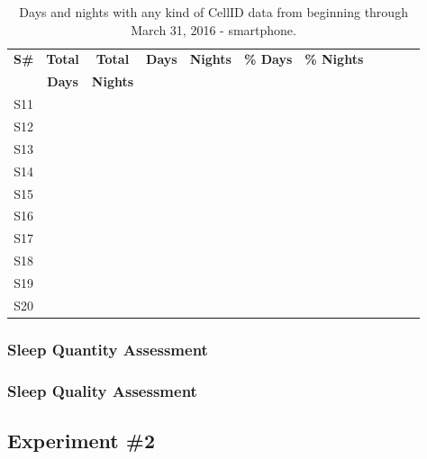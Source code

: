 \documentclass[12pt]{article} %
\begin{document}
\begin{table}[H]
\center
\begin{footnotesize}
	\begin{tabular}{| c | c | c || c | c | c | c | c | c | c | c |}
	\hline
	\textbf{S\#} & \textbf{Total} & \textbf{Total} & \textbf{Days} & \textbf{Nights} & \textbf{\% Days} & \textbf{\% Nights}\\
	& \textbf{Days} & \textbf{Nights} & & & &\\
	\hline
	S11 & & & & & &\\
	S12 & & & & & & \\
	S13 & & & & & & \\
	S14 & & & & & & \\
	S15 & & & & & & \\
	S16 & & & & & & \\
	S17 & & & & & & \\
	S18 & & & & & & \\
	S19 & & & & & & \\
	S20 & & & & & & \\
	\hline
	\end{tabular}
	\caption{Days and nights with any kind of CellID data from beginning through March 31, 2016 - smartphone.}
	\label{tab:daysNightsExp1Phone}
\end{footnotesize}
\end{table}


\subsubsection{Sleep Quantity Assessment}






\subsubsection{Sleep Quality Assessment}




\newpage
\subsection{Experiment \#2}
\end{document}
